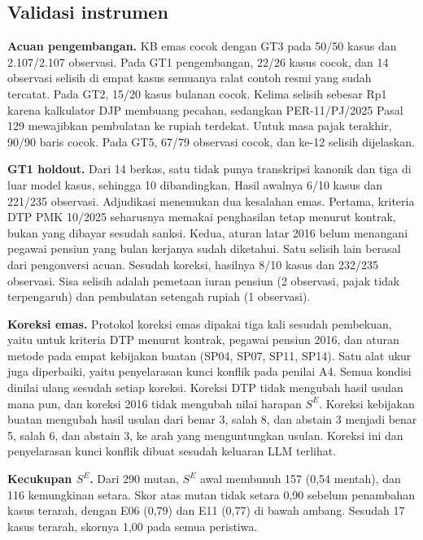 \documentclass[conference]{IEEEtran}
\makeatletter
\DeclareRobustCommand{\en}[1]{{\usefont{\f@encoding}{\f@family}{\f@series}{it}#1\/}}
\newcommand{\SE}{S^{E}}
\makeatother
\begin{document}
\subsection{Validasi instrumen}
\label{subsec:hasil-instrumen}
\textbf{Acuan pengembangan.} KB emas cocok dengan GT3 pada 50/50 kasus dan 2.107/2.107 observasi. Pada GT1 pengembangan, 22/26 kasus cocok, dan 14 observasi selisih di empat kasus semuanya ralat contoh resmi yang sudah tercatat. Pada GT2, 15/20 kasus bulanan cocok. Kelima selisih sebesar Rp1 karena kalkulator DJP membuang pecahan, sedangkan PER-11/PJ/2025 Pasal 129 mewajibkan pembulatan ke rupiah terdekat. Untuk masa pajak terakhir, 90/90 baris cocok. Pada GT5, 67/79 observasi cocok, dan ke-12 selisih dijelaskan.

\textbf{GT1 \en{holdout}.} Dari 14 berkas, satu tidak punya transkripsi kanonik dan tiga di luar model kasus, sehingga 10 dibandingkan. Hasil awalnya 6/10 kasus dan 221/235 observasi. Adjudikasi menemukan dua kesalahan emas. Pertama, kriteria DTP PMK 10/2025 seharusnya memakai penghasilan tetap menurut kontrak, bukan yang dibayar sesudah sanksi. Kedua, aturan latar 2016 belum menangani pegawai pensiun yang bulan kerjanya sudah diketahui. Satu selisih lain berasal dari pengonversi acuan. Sesudah koreksi, hasilnya 8/10 kasus dan 232/235 observasi. Sisa selisih adalah pemetaan iuran pensiun (2 observasi, pajak tidak terpengaruh) dan pembulatan setengah rupiah (1 observasi).

\textbf{Koreksi emas.} Protokol koreksi emas dipakai tiga kali sesudah pembekuan, yaitu untuk kriteria DTP menurut kontrak, pegawai pensiun 2016, dan aturan metode pada empat kebijakan buatan (SP04, SP07, SP11, SP14). Satu alat ukur juga diperbaiki, yaitu penyelarasan kunci konflik pada penilai A4. Semua kondisi dinilai ulang sesudah setiap koreksi. Koreksi DTP tidak mengubah hasil usulan mana pun, dan koreksi 2016 tidak mengubah nilai harapan $\SE$. Koreksi kebijakan buatan mengubah hasil usulan dari benar 3, salah 8, dan \en{abstain} 3 menjadi benar 5, salah 6, dan \en{abstain} 3, ke arah yang menguntungkan usulan. Koreksi ini dan penyelarasan kunci konflik dibuat sesudah keluaran LLM terlihat.

\textbf{Kecukupan $\SE$.} Dari 290 mutan, $\SE$ awal membunuh 157 (0,54 mentah), dan 116 kemungkinan setara. Skor atas mutan tidak setara 0,90 sebelum penambahan kasus terarah, dengan E06 (0,79) dan E11 (0,77) di bawah ambang. Sesudah 17 kasus terarah, skornya 1,00 pada semua peristiwa.
\end{document}
